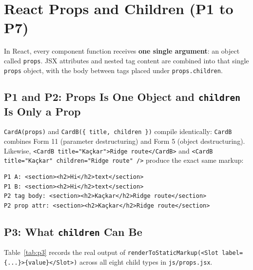 \documentclass[11pt, a4paper]{article}
\begin{document}
\section{React Props and Children (P1 to P7)}

In React, every component function receives \textbf{one single argument}: an object called \texttt{props}. JSX attributes and nested tag content are combined into that single \texttt{props} object, with the body between tags placed under \texttt{props.children}.

\subsection{P1 and P2: Props Is One Object and \texttt{children} Is Only a Prop}
\texttt{CardA(props)} and \texttt{CardB(\{ title, children \})} compile identically: \texttt{CardB} combines Form 11 (parameter destructuring) and Form 5 (object destructuring). Likewise, \texttt{<CardB title="Kaçkar">Ridge route</CardB>} and \texttt{<CardB title="Kaçkar" children="Ridge route" />} produce the exact same markup:
\begin{lstlisting}
P1 A: <section><h2>Hi</h2>text</section>
P1 B: <section><h2>Hi</h2>text</section>
P2 tag body: <section><h2>Kaçkar</h2>Ridge route</section>
P2 prop attr: <section><h2>Kaçkar</h2>Ridge route</section>
\end{lstlisting}

\subsection{P3: What \texttt{children} Can Be}
Table~\ref{tab:p3} records the real output of \texttt{renderToStaticMarkup(<Slot label=\{...\}>\{value\}</Slot>)} across all eight child types in \texttt{js/props.jsx}.
\end{document}
